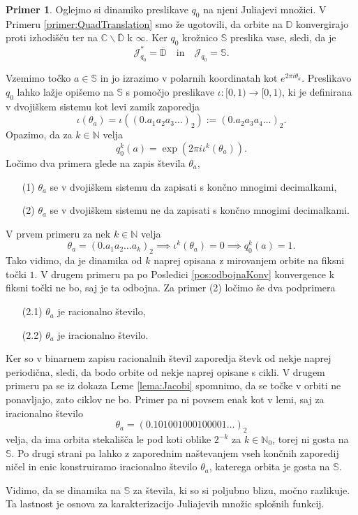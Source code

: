 \documentclass[12pt,a4paper]{amsart}
\theoremstyle{definition} %
\newtheorem{primer}[definicija]{Primer}
\theoremstyle{plain} %
\newcommand{\N}{\mathbb N}
\newcommand{\CC}{\mathbb C}
\newcommand{\D}{\mathbb D} %
\newcommand{\SSS}{\mathbb S} %
\newcommand{\J}{\mathscr J} %
\begin{document}
\begin{primer}
Oglejmo si dinamiko preslikave $q_0$ na njeni Juliajevi množici.
V Primeru \ref{primer:QuadTranslation} smo že ugotovili, da orbite na $\D$
konvergirajo proti izhodišču ter na $\CC \smallsetminus \overline{\D}$ k $\infty$.
Ker $q_0$  krožnico $\SSS$ preslika vase, sledi, da je 
$$\J_{q_0}^\ast = \overline{\D} \quad \text{in} \quad \J_{q_0} = \SSS.$$

Vzemimo točko $a\in\SSS$ in jo izrazimo v polarnih koordinatah kot $e^{2\pi i \theta_a}$.
Preslikavo $q_0$ lahko lažje opišemo na $\SSS$ s pomočjo preslikave $\iota \colon [0, 1) \to [0, 1)$,
ki je definirana v dvojiškem sistemu kot levi zamik zaporedja
$$\iota(\theta_a) = \iota((0.a_1 a_2 a_3\dots)_2) := (0.a_2a_3a_4\dots)_2.$$
Opazimo, da za $k\in\N$ velja 
$$q_0^k(a) = \exp(2\pi i \iota^k(\theta_a)).$$
Ločimo dva primera glede na zapis števila $\theta_a$,
\begin{itemize}
\item[(1)] $\theta_a$ se v dvojiškem sistemu da zapisati s končno mnogimi decimalkami,
\item[(2)] $\theta_a$ se v dvojiškem sistemu ne da zapisati s končno mnogimi decimalkami.
\end{itemize}
V prvem primeru za nek $k\in\N$ velja 
$$\theta_a = (0.a_1a_2\dots a_k)_2 \implies \iota^k(\theta_a) = 0 \implies q_0^k(a) = 1.$$
Tako vidimo, da je dinamika  od $k$ naprej opisana z mirovanjem orbite na fiksni točki $1$.
V drugem primeru pa po Posledici \ref{pos:odbojnaKonv} konvergence k fiksni točki ne bo, saj je ta odbojna. 
Za primer (2) ločimo še dva podprimera
\begin{itemize}
\item[(2.1)] $\theta_a$ je racionalno število,
\item[(2.2)] $\theta_a$ je iracionalno število.
\end{itemize}
Ker so v binarnem zapisu racionalnih števil zaporedja števk od nekje naprej periodična,
sledi, da bodo orbite od nekje naprej opisane s cikli.
V drugem primeru pa se iz dokaza Leme \ref{lema:Jacobi} spomnimo, da se točke v orbiti ne ponavljajo,
zato ciklov ne bo. Primer pa ni povsem enak kot v lemi, saj za iracionalno število 
$$\theta_a = (0.101001000100001\dots)_2$$
velja, da ima orbita stekališča le pod koti oblike $2^{-k}$ za $k\in\N_0$, torej ni gosta na $\SSS$.
Po drugi strani pa lahko z zaporednim naštevanjem vseh končnih zaporedij ničel in enic konstruiramo 
iracionalno število $\theta_a$, katerega orbita je gosta na $\SSS$.

Vidimo, da se dinamika na $\SSS$ za števila, ki so si poljubno blizu, močno razlikuje.
Ta lastnost je osnova za karakterizacijo Juliajevih množic splošnih funkcij.
\end{primer}
\end{document}
